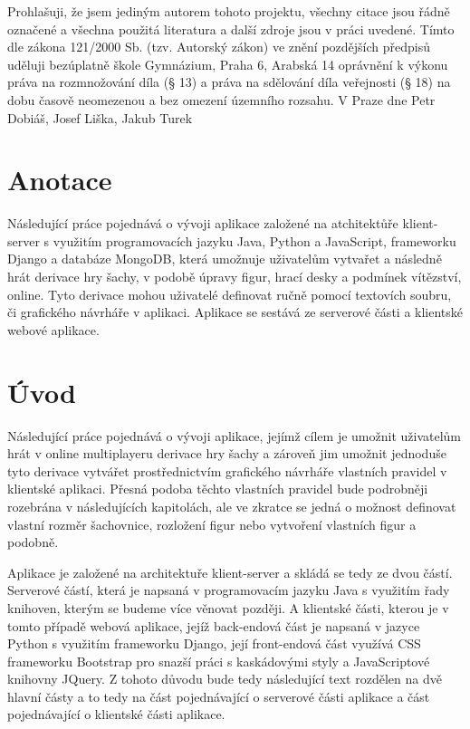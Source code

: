 \documentclass[12pt]{article}
\begin{document}
\graphicspath{{./pictures/}}
\renewcommand*\contentsname{Obsah}
\renewcommand{\bibfont}{\small}
\renewcommand{\thesection}{\Roman{section}} 
\renewcommand{\thesubsection}{\thesection.\Roman{subsection}}
\renewcommand{\thesubsubsection}{\thesubsection.\Roman{subsubsection}}
\renewcommand\listoflistingscaption{Seznam příloh}
\renewcommand{\listingscaption}{Příloha}

\newpage{}
\thispagestyle{empty}
\mbox{}
\vfill
Prohlašuji, že jsem jediným autorem tohoto projektu, všechny citace jsou řádně označené a všechna použitá literatura a další zdroje jsou v práci uvedené. Tímto dle zákona 121/2000 Sb. (tzv. Autorský zákon) ve znění pozdějších předpisů uděluji bezúplatně škole Gymnázium, Praha 6, Arabská 14
oprávnění k výkonu práva na rozmnožování díla (§ 13) a práva na sdělování díla veřejnosti (§ 18) na dobu časově neomezenou a bez omezení územního rozsahu.
\newline
V Praze dne \hfill Petr Dobiáš, Josef Liška, Jakub Turek
\newpage{}
\thispagestyle{empty}
\section*{Anotace}
Následující práce pojednává o vývoji aplikace založené na atchitektůře klient-server s využitím programovacích jazyku Java, Python a JavaScript, frameworku Django a databáze MongoDB, která umožnuje uživatelům vytvařet a následně hrát derivace hry šachy, v podobě úpravy figur, hrací desky a podmínek vítězství, online. Tyto derivace mohou uživatelé definovat ručně pomocí textovích soubru, či grafického návrháře v aplikaci. Aplikace se sestává ze serverové části a klientské webové aplikace.
\newpage
\setcounter{page}{1}
\tableofcontents 
\newpage
\section*{Úvod}
Následující práce pojednává o vývoji aplikace, jejímž cílem je umožnit uživatelům hrát v online multiplayeru derivace hry šachy a zároveň jim umožnit jednoduše tyto derivace vytvářet prostřednictvím grafického návrháře vlastních pravidel v klientské aplikaci. Přesná podoba těchto vlastních pravidel bude podrobněji rozebrána v následujících kapitolách, ale ve zkratce se jedná o možnost definovat vlastní rozměr šachovnice, rozložení figur nebo vytvoření vlastních figur a podobně.

Aplikace je založené na architektuře klient-server a skládá se tedy ze dvou částí. Serverové částí, která je napsaná v programovacím jazyku Java s využitím řady knihoven, kterým se budeme více věnovat později. A klientské části, kterou je v tomto případě webová aplikace, jejíž back-endová část je napsaná v jazyce Python s využitím frameworku Django, její front-endová část využívá CSS frameworku Bootstrap pro snazší práci s kaskádovými styly a JavaScriptové knihovny JQuery. Z tohoto důvodu bude tedy následující text rozdělen na dvě hlavní částy a to tedy na část pojednávající o serverové části aplikace a část pojednávající o klientské části aplikace.
\newpage
\end{document}
